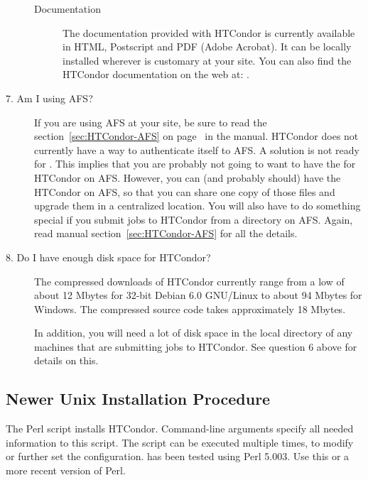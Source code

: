 \begin{description}
\begin{description}
\item[Documentation]

The documentation provided with HTCondor is currently available in
     HTML, Postscript and PDF (Adobe Acrobat).  It can be locally installed
     wherever is customary at your site.  You can also find the HTCondor
     documentation on the web at:
     .

\end{description}

\item[7. Am I using AFS?]

If you are using AFS at your site, be sure to read the
section~\ref{sec:HTCondor-AFS} on page~\pageref{sec:HTCondor-AFS} in the
manual.
HTCondor does not currently have a way to authenticate itself to AFS.
A solution is not ready for
\VersionNotice.
This implies that you are probably not going to want
to have the  for HTCondor on AFS.
However, you can
(and probably should) have the HTCondor  on AFS, so
that you can share one copy of those files and upgrade them in a
centralized location.  You will also have to do something special if
you submit jobs to HTCondor from a directory on AFS.  Again, read manual
section~\ref{sec:HTCondor-AFS} for all the details.

\item[8. Do I have enough disk space for HTCondor?]

The compressed downloads of HTCondor currently range from a low of about 12
Mbytes for 32-bit Debian 6.0 GNU/Linux to about 94 Mbytes for Windows.  The
compressed source code takes approximately 18 Mbytes.

In addition, you will need a lot of disk space in the local directory
of any machines that are submitting jobs to HTCondor.  See question 6
above for details on this.

\end{description}

\subsection{\label{sec:new-install-procedure}
Newer Unix Installation Procedure}

The Perl script  installs HTCondor.
Command-line arguments specify all needed information to this
script.  The script can be executed multiple times, to modify or further
set the configuration.   has been tested using Perl 5.003.
Use this or a more recent version of Perl.

